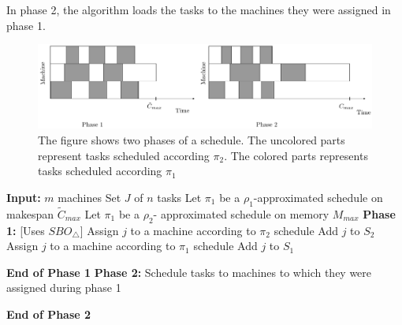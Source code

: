                   In phase 2, the algorithm loads the tasks to the machines they were assigned in phase 1.
                  
                    \begin{figure}[htp]
                    \centering
                    \includegraphics[width= 16 cm]{mem2.pdf}
                    \caption{The figure shows two phases of a schedule. The uncolored parts  represent tasks scheduled according $\pi_2$. The colored parts represents tasks scheduled according $\pi_1$}
                    \label{fig:memory}
                    \end{figure} 
                      \begin{algorithm}                    
                      \caption{$SABO_\triangle$}
                      \label{alg2}
                       \begin{algorithmic} 
                       \State \textbf{Input:} $m$ machines 
                       \State \hspace*{42pt}Set $J$ of $n$ tasks
                       \State\hspace*{42pt}Let $\pi_1$ be a $ \rho_1$-approximated schedule on makespan $\tilde{C}_{max}$ 
                      \State \hspace*{42pt}Let $\pi_1$ be a $\rho_2$- approximated schedule on memory ${M_{max}}$
                      \State
                       \State \textbf{Phase 1:} [Uses $SBO_\triangle$]
                    \State Assign $j$ to a machine according to $\pi_2$ schedule
                    \State Add $j$ to $S_2$
                    \Else
                    \State Assign $j$ to a machine according to $\pi_1$ schedule
                    \State Add $j$ to $S_1$   
                    \EndIf 
                    \EndFor
                   
                     \State \textbf{End of Phase 1} 
                     \State 
                      \State \textbf{Phase 2:} 
                      \State \hspace*{42pt}Schedule tasks to machines to which they were assigned during phase 1
                         
                      \State \textbf{End of Phase 2} 
                       
                            \end{algorithmic}
                            \end{algorithm}     
        
